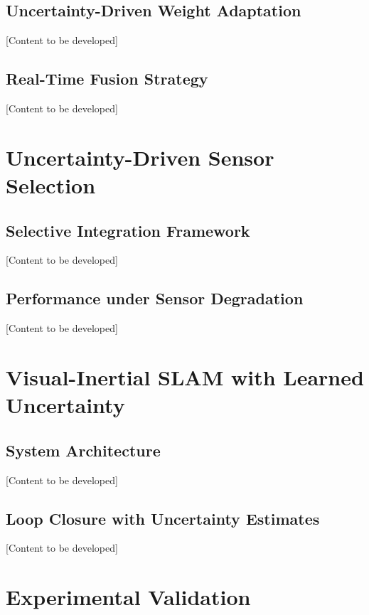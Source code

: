 \subsection{Uncertainty-Driven Weight Adaptation}

[Content to be developed]

\subsection{Real-Time Fusion Strategy}

[Content to be developed]

\section{Uncertainty-Driven Sensor Selection}

\subsection{Selective Integration Framework}

[Content to be developed]

\subsection{Performance under Sensor Degradation}

[Content to be developed]

\section{Visual-Inertial SLAM with Learned Uncertainty}

\subsection{System Architecture}

[Content to be developed]

\subsection{Loop Closure with Uncertainty Estimates}

[Content to be developed]

\section{Experimental Validation}

